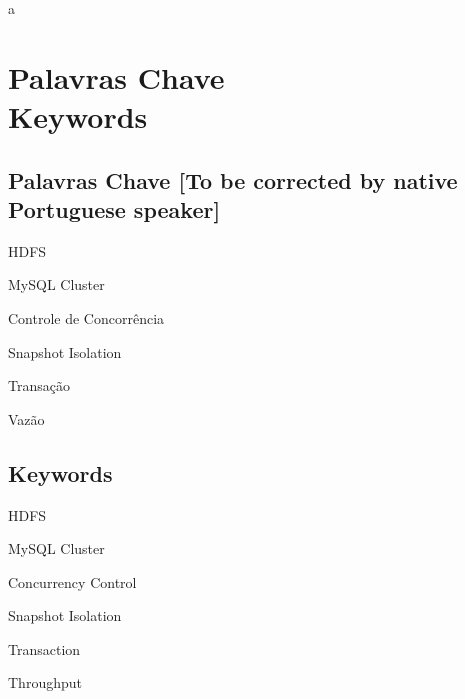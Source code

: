 \noindent a

\newpage


\chapter*{Palavras Chave \\ Keywords}
\thispagestyle{empty}

\section*{Palavras Chave [To be corrected by native Portuguese speaker]}
{\large %

\noindent HDFS

\noindent MySQL Cluster

\noindent Controle de Concorrência

\noindent Snapshot Isolation

\noindent Transação

\noindent Vazão

}

\section*{Keywords}

{\large %

\noindent HDFS

\noindent MySQL Cluster

\noindent Concurrency Control

\noindent Snapshot Isolation

\noindent Transaction

\noindent Throughput

}

\vfill

\cleardoublepage



\pagestyle{plain}



\def\contentsname{Index}
\tableofcontents
\newpage

\listoffigures
\newpage

\listoftables

\cleardoublepage


